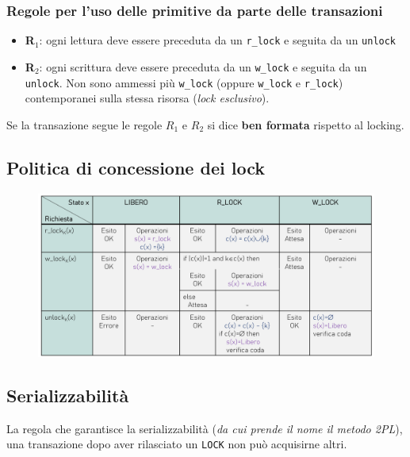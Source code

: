 \documentclass[oneside,a4paper,11pt]{book}
\theoremstyle{italicstyle}
\theoremstyle{normStyle}
\begin{document}
\subsubsection{Regole per l'uso delle primitive da parte delle transazioni}
\begin{itemize}
  \item \textbf{R$_1$}: ogni lettura deve essere preceduta da un \verb|r_lock| 
  e seguita da un \verb|unlock|
  \item \textbf{R$_2$}: ogni scrittura deve essere preceduta da un \verb|w_lock| e 
  seguita da un \verb|unlock|. Non sono ammessi più \verb|w_lock| (oppure \verb|w_lock| e \verb|r_lock|)
  contemporanei sulla stessa risorsa (\textit{lock esclusivo}).
\end{itemize}
Se la transazione segue le regole $R_1$ e $R_2$ si dice \textbf{ben formata} 
rispetto al locking.
\subsection{Politica di concessione dei lock}
\begin{figure}[H]
  \centering
  \includegraphics[width=12cm]{img/Tabella_gestione_lock.png}
\end{figure}
\subsection{Serializzabilità}
La regola che garantisce la serializzabilità (\textit{da cui prende il nome il metodo 
2PL}), una transazione dopo aver rilasciato un \verb|LOCK| non può acquisirne altri.
\begin{figure}[H]
  \centering
\end{figure}
\end{document}
